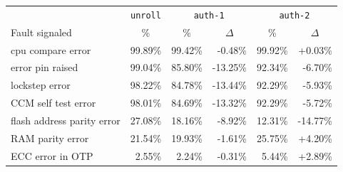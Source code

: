\documentclass[10pt]{article}
\newcommand{\unroll}{\texttt{unroll}\xspace}
\newcommand{\authone}{\texttt{auth-1}\xspace}
\newcommand{\authtwo}{\texttt{auth-2}\xspace}
\begin{document}
        \begin{table}[H]
          \centering
          \begin{tabular}{lr|rr|rr}
          \toprule
          \multicolumn{1}{c}{\ }
          & \multicolumn{1}{c}{\unroll}
          & \multicolumn{2}{c}{\authone}
          & \multicolumn{2}{c}{\authtwo}
          \\
          \cmidrule(lr){2-2}  
          \cmidrule(lr){3-4}  
          \cmidrule(lr){5-6}  
          Fault signaled
          & \multicolumn{1}{c}{\%} 
          & \multicolumn{1}{c}{\%} & \multicolumn{1}{c}{$\Delta$} & \multicolumn{1}{c}{\%} & \multicolumn{1}{c}{$\Delta$}
          \\
          \midrule
          cpu compare error 
          & 99.89\%
          & 99.42\% & -0.48\%
          & 99.92\% & +0.03\%
          \\
          error pin raised 
          & 99.04\%
          & 85.80\% & -13.25\%
          & 92.34\% & -6.70\%
          \\
          lockstep error 
          & 98.22\%
          & 84.78\% & -13.44\%
          & 92.29\% & -5.93\%
          \\
          CCM self test error 
          & 98.01\%
          & 84.69\% & -13.32\%
          & 92.29\% & -5.72\%
          \\
          flash address parity error%
          & 27.08\%
          & 18.16\% & -8.92\%
          & 12.31\% & -14.77\%
          \\
          RAM parity error 
          & 21.54\%
          & 19.93\% & -1.61\%
          & 25.75\% & +4.20\%
          \\
          ECC error in OTP 
          & 2.55\%
          & 2.24\% & -0.31\%
          & 5.44\% & +2.89\%
          \\

\end{tabular}
\end{table}
\end{document}
